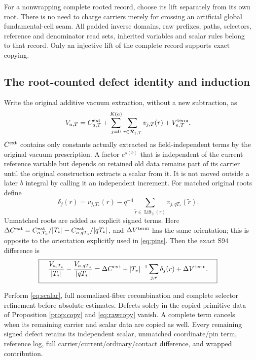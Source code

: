 \documentclass[11pt,letterpaper]{article}
\theoremstyle{remark}\newtheorem{remark}[theorem]{Remark}
\begin{document}
For a nonwrapping complete rooted record, choose its lift separately from its own root. There is no need to charge carriers merely for crossing an artificial global fundamental-cell seam. All padded inverse domains, raw prefixes, paths, selectors, reference and denominator read sets, inherited variables and scalar rules belong to that record. Only an injective lift of the complete record supports exact copying.

\subsection{The root-counted defect identity and induction}

Write the original additive vacuum extraction, without a new subtraction, as
\[
 V_{a,T}
 =C^{\rm ext}_{a,T}
 +\sum_{j=0}^{K(a)}\sum_{r\in\mathcal R_{j,T}}v_{j,T}(r)
 +V^{\rm term}_{a,T}.
\]
$C^{\rm ext}$ contains only constants actually extracted as field-independent terms by the original vacuum prescription. A factor $e^{s(b)}$ that is independent of the current reference variable but depends on retained old data remains part of its carrier until the original construction extracts a scalar from it. It is not moved outside a later $b$ integral by calling it an independent increment.
For matched original roots define
\[
 \delta_j(r)=v_{j,T_*}(r)
  -q^{-4}\sum_{\tilde r\in\operatorname{Lift}_q(r)}
                      v_{j,qT_*}(\tilde r).
\]
Unmatched roots are added as explicit signed terms. Here $\Delta C^{\rm ext}=C^{\rm ext}_{a,T_*}/|T_*|-C^{\rm ext}_{a,qT_*}/|qT_*|$, and $\Delta V^{\rm term}$ has the same orientation; this is opposite to the orientation explicitly used in \eqref{eq:pins}. Then the exact S94 difference is
\begin{equation}\label{eq:defect}
 \boxed{\quad
 \frac{V_{a,T_*}}{|T_*|}
 -\frac{V_{a,qT_*}}{|qT_*|}
 =\Delta C^{\rm ext}
  +|T_*|^{-1}\sum_{j,r}\delta_j(r)
  +\Delta V^{\rm term}.
 \quad}
\end{equation}

Perform \eqref{eq:scalar}, full normalized-fiber recombination and complete selector refinement before absolute estimates. Defects solely in the copied primitive data of Proposition \ref{prop:copy} and \eqref{eq:rawcopy} vanish. A complete term cancels when its remaining carrier and scalar data are copied as well. Every remaining signed defect retains its independent scalar, unmatched coordinate/pin term, reference log, full carrier/current/ordinary/contact difference, and wrapped contribution.
\end{document}
